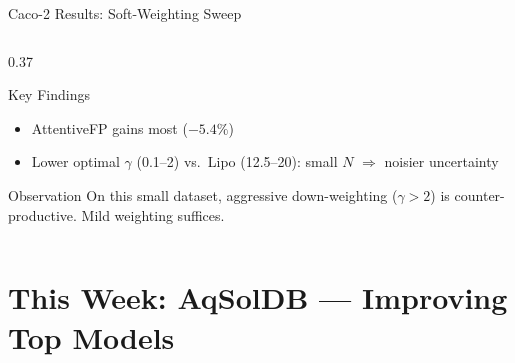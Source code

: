 \documentclass[aspectratio=169]{beamer}
\begin{document}
\begin{frame}[t,shrink=15]{Caco-2 Results: Soft-Weighting Sweep}
\begin{columns}[T]
\begin{column}{0.37\textwidth}
\begin{alertblock}{Key Findings}
\begin{itemize}
  \item AttentiveFP gains most ($-5.4\%$)
  \item Lower optimal $\gamma$ (0.1--2) vs.\ Lipo (12.5--20): small $N$ $\Rightarrow$ noisier uncertainty
\end{itemize}
\end{alertblock}
\vspace{4pt}
\begin{block}{Observation}
\footnotesize On this small dataset, aggressive down-weighting ($\gamma{>}2$) is counter-productive. Mild weighting suffices.
\end{block}
\end{column}
\end{columns}
\end{frame}

\section{This Week: AqSolDB — Improving Top Models}
\end{document}
